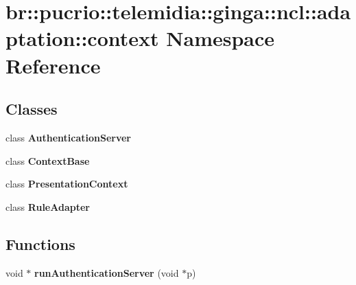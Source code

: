 \section{br::pucrio::telemidia::ginga::ncl::adaptation::context Namespace Reference}
\label{namespacebr_1_1pucrio_1_1telemidia_1_1ginga_1_1ncl_1_1adaptation_1_1context}


\subsection*{Classes}
\begin{CompactItemize}
\item 
class {\bf AuthenticationServer}
\item 
class {\bf ContextBase}
\item 
class {\bf PresentationContext}
\item 
class {\bf RuleAdapter}
\end{CompactItemize}
\subsection*{Functions}
\begin{CompactItemize}
\item 
void $\ast$ \textbf{runAuthenticationServer} (void $\ast$p)\label{namespacebr_1_1pucrio_1_1telemidia_1_1ginga_1_1ncl_1_1adaptation_1_1context_8252fdd4cbc1f14d4a4695d827bbe31d}

\end{CompactItemize}
